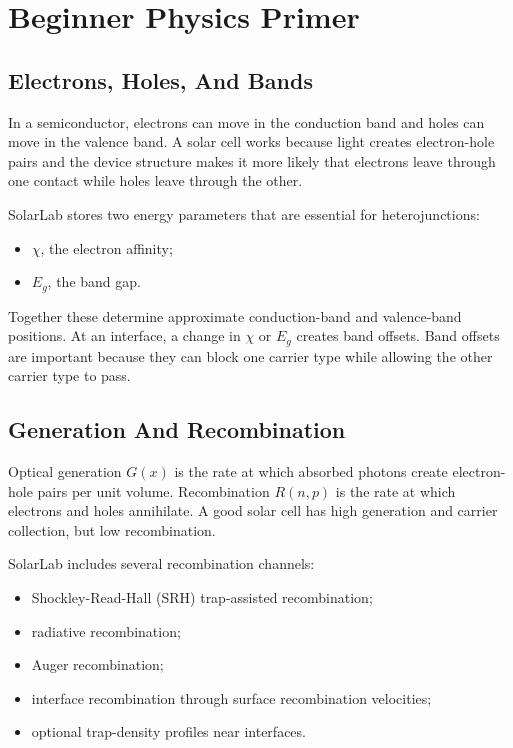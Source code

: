 \documentclass[
  11pt,
  american,
]{report}
\providecommand{\tightlist}{%
  \setlength{\itemsep}{0pt}\setlength{\parskip}{0pt}}
\begin{document}
\hypertarget{beginner-physics-primer}{%
\chapter{Beginner Physics Primer}\label{beginner-physics-primer}}

\hypertarget{electrons-holes-and-bands}{%
\section{Electrons, Holes, And Bands}\label{electrons-holes-and-bands}}

In a semiconductor, electrons can move in the conduction band and holes
can move in the valence band. A solar cell works because light creates
electron-hole pairs and the device structure makes it more likely that
electrons leave through one contact while holes leave through the other.

SolarLab stores two energy parameters that are essential for
heterojunctions:

\begin{itemize}
\tightlist
\item
  \(\chi\), the electron affinity;
\item
  \(E_g\), the band gap.
\end{itemize}

Together these determine approximate conduction-band and valence-band
positions. At an interface, a change in \(\chi\) or \(E_g\) creates band
offsets. Band offsets are important because they can block one carrier
type while allowing the other carrier type to pass.

\hypertarget{generation-and-recombination}{%
\section{Generation And
Recombination}\label{generation-and-recombination}}

Optical generation \(G(x)\) is the rate at which absorbed photons create
electron-hole pairs per unit volume. Recombination \(R(n,p)\) is the
rate at which electrons and holes annihilate. A good solar cell has high
generation and carrier collection, but low recombination.

SolarLab includes several recombination channels:

\begin{itemize}
\tightlist
\item
  Shockley-Read-Hall (SRH) trap-assisted recombination;
\item
  radiative recombination;
\item
  Auger recombination;
\item
  interface recombination through surface recombination velocities;
\item
  optional trap-density profiles near interfaces.
\end{itemize}
\end{document}
